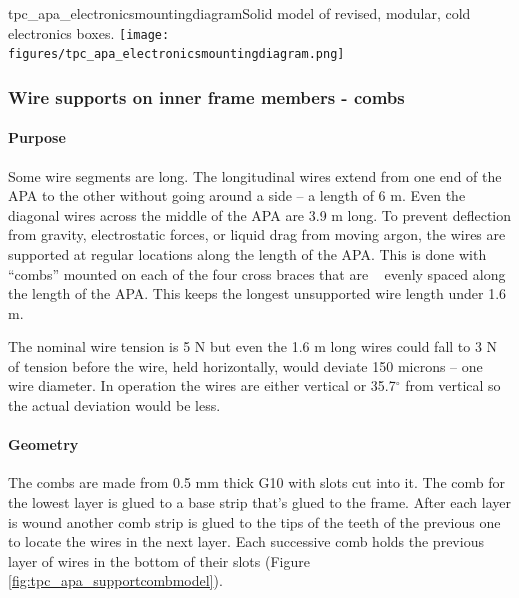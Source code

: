 \begin{cdrfigure}{tpc_apa_electronicsmountingdiagram}{Solid model of revised, modular, cold electronics boxes.}
\texttt{[image: figures/tpc\_apa\_electronicsmountingdiagram.png]} 
\end{cdrfigure}

\subsubsection{Wire supports on inner frame members - combs}

\paragraph{Purpose}

Some wire segments are long.  The longitudinal wires extend from one end of the APA to the other without going around a side -- a length of 6 m.  Even the diagonal wires across the middle of the APA are 3.9 m long.  To prevent deflection from gravity, electrostatic forces, or liquid drag from moving argon, the wires are supported at regular locations along the length of the APA.  This is done with ``combs'' mounted on each of the four cross braces that are ~ evenly spaced along the length of the APA.  This keeps the longest unsupported wire length under 1.6 m.

The nominal wire tension is 5 N but even the 1.6 m long wires could fall to 3 N of tension before the wire, held horizontally, would deviate 150 microns -- one wire diameter.  In operation the wires are either vertical or 35.7$^{\circ}$ from vertical so the actual deviation would be less.

\paragraph{Geometry}

The combs are made from 0.5 mm thick G10 with slots cut into it.  The comb for the lowest layer is glued to a base strip that's glued to the frame.  After each layer is wound another comb strip is glued to the tips of the teeth of the previous one to locate the wires in the next layer.  Each successive comb holds the previous layer of wires in the bottom of their slots (Figure \ref{fig:tpc_apa_supportcombmodel}).

